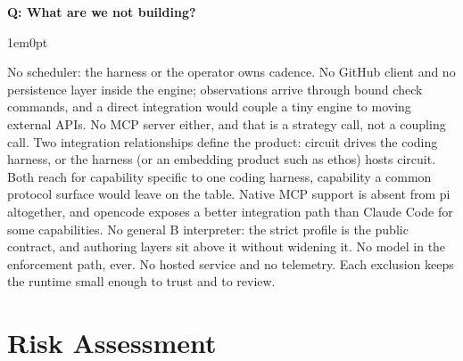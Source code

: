 \documentclass[11pt,letterpaper]{article}
\newcounter{faqnum}
\newenvironment{faqpair}[1]{%
  \needspace{4\baselineskip}%
  \vspace{0.5em}%
  \refstepcounter{faqnum}%
  \noindent\textbf{\color{SectionBlue}Q\thefaqnum: #1}\par\nopagebreak[4]%
  \vspace{0.2em}%
  \begin{adjustwidth}{1em}{0pt}%
  \setlength{\parindent}{0pt}%
}{%
  \end{adjustwidth}%
  \vspace{0.5em}%
}
\begin{document}
\begin{faqpair}{What are we not building?}
\label{faq:not-building}
  No scheduler: the harness or the operator owns cadence. No GitHub client and no persistence layer inside the engine; observations arrive through bound check commands, and a direct integration would couple a tiny engine to moving external APIs. No MCP server either, and that is a strategy call, not a coupling call. Two integration relationships define the product: circuit drives the coding harness, or the harness (or an embedding product such as ethos) hosts circuit. Both reach for capability specific to one coding harness, capability a common protocol surface would leave on the table. Native MCP support is absent from pi altogether, and opencode exposes a better integration path than Claude Code for some capabilities. No general B interpreter: the strict profile is the public contract, and authoring layers sit above it without widening it. No model in the enforcement path, ever. No hosted service and no telemetry. Each exclusion keeps the runtime small enough to trust and to review.
\end{faqpair}


\newpage
\section*{Risk Assessment}
\end{document}
